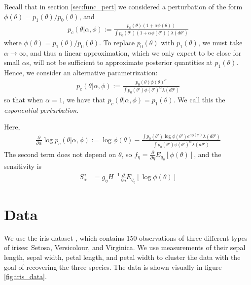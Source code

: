 \documentclass[a4paper]{article}
\begin{document}
Recall that in section \ref{sec:func_pert} we considered a perturbation of the form
$\phi(\theta) = p_1(\theta) / p_0(\theta)$, and
\begin{align}
	p_c(\theta | \alpha, \phi) :=  \frac{p_0(\theta)(1 + \alpha \phi(\theta))}{\int p_0(\theta')(1 + \alpha \phi(\theta'))\lambda(d\theta')}
\end{align}
where $\phi(\theta) = p_1(\theta) / p_0(\theta)$. To replace $p_0(\theta)$ with $p_1(\theta)$, we must take
$\alpha \rightarrow \infty$,
and thus a linear approximation, which we only expect to be close for small $\alpha$s,
will not be sufficient to approximate posterior quantities at $p_1(\theta)$. Hence, we
consider an alternative parametrization:
\begin{align}
	\label{eq:expon_perturb}
	p_c(\theta | \alpha, \phi) :=
  \frac{p_0(\theta)\phi(\theta)^\alpha}{\int p_0(\theta')\phi(\theta')^\alpha \lambda(d\theta')}
\end{align}
so that when $\alpha = 1$, we have that $p_c(\theta | \alpha, \phi) = p_1(\theta)$. We call this
the {\itshape exponential perturbation}.

Here,
\begin{align}
  \frac{\partial}{\partial \alpha} \log p_c(\theta | \alpha, \phi) := \log \phi(\theta) -
    \frac{\int p_0(\theta')\log\phi(\theta')e^{\alpha\phi(\theta')} \lambda(d\theta')}{\int p_0(\theta')\phi(\theta')^\alpha \lambda(d\theta')}
\end{align}
The second term does not depend on $\theta$, so $f_\eta = \frac{\partial}{\partial \eta} E_{q_\eta}[\phi(\theta)]$,
and the sensitivity is
\begin{align}
  S^q_\alpha &= g_\eta H^{-1}\frac{\partial}{\partial \eta} E_{q_\eta}[\log \phi(\theta)]
  \label{eq:sensitivity_exp_pert}
\end{align}


\section{Data}
We use the iris dataset \cite{iris_dataset}, which contains 150 observations of
three different types
of irises: Setosa, Versicolour, and Virginica. We use measurements of their
sepal length, sepal width, petal length, and petal width to cluster the data with
the goal of recovering the three species. The data is shown visually in figure \ref{fig:iris_data}.
\end{document}
